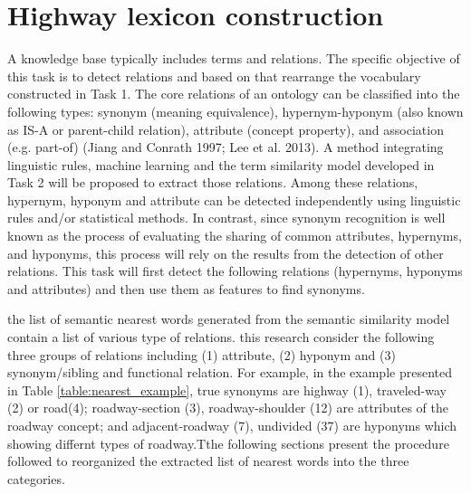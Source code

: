 \documentclass[Journal, InsideFigs, DoubleSpace]{ascelike} %
\begin{document}
\section{Highway lexicon construction}
A knowledge base typically includes terms and relations. The specific objective of this task is to detect relations and based on that rearrange the vocabulary constructed in Task 1. The core relations of an ontology can be classified into the following types: synonym (meaning equivalence), hypernym-hyponym (also known as IS-A or parent-child relation), attribute (concept property), and association (e.g. part-of) (Jiang and Conrath 1997; Lee et al. 2013). A method integrating linguistic rules, machine learning and the term similarity model developed in Task 2 will be proposed to extract those relations. Among these relations, hypernym, hyponym and attribute can be detected independently using linguistic rules and/or statistical methods. In contrast, since synonym recognition is well known as the process of evaluating the sharing of common attributes, hypernyms, and hyponyms, this process will rely on the results from the detection of other relations. This task will first detect the following relations (hypernyms, hyponyms and attributes) and then use them as features to find synonyms.
\par
the list of semantic nearest words generated from the semantic similarity model contain a list of various type of relations. this research consider the following three groups of relations including (1) attribute, (2) hyponym and (3) synonym/sibling and functional relation. For example, in the example presented in Table \ref{table:nearest_example}, true synonyms are highway (1), traveled-way (2) or road(4); roadway-section (3), roadway-shoulder (12) are attributes of the roadway concept; and adjacent-roadway (7), undivided (37) are hyponyms which showing differnt types of roadway.Tthe following sections present the procedure followed to reorganized the extracted list of nearest words into the three categories. 
\end{document}
